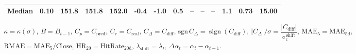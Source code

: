 \begin{threeparttable}
{\begin{tabular}{lrrrrrrrrrrrrr}
 Median &     0.10 & 151.8 & 151.8 & 152.0 &       -0.4 &                     -1.0 &                 0.5 &         -- &        -- &             -- &              1.1 &            0.73 &                  15.00 \\
\bottomrule
\end{tabular}
}
\begin{tablenotes}\footnotesize
\item $\kappa=\kappa(\sigma)$, $B=B_{t-1}$, $C_p=C_{\text{pred}}$, $C_r=C_{\text{real}}$, $C_\Delta=C_{\text{diff}}$, $\mathrm{sgn}\,C_\Delta=\operatorname{sign}(C_{\text{diff}})$, $|C_\Delta|/\sigma=\dfrac{|C_{\text{diff}}|}{\sigma_t^{\text{shift}}}$, $\mathrm{MAE}_5=\mathrm{MAE}_{5\text{d}}$, $\mathrm{RMAE}= \mathrm{MAE}_5 / \text{Close}$, $\mathrm{HR}_{20}=\mathrm{HitRate}_{20\text{d}}$, 
$\lambda_{\text{shift}}=\lambda_t$, 
$\Delta\alpha_t=\alpha_t-\alpha_{t-1}$.
\end{tablenotes}
\end{threeparttable}
\endgroup
